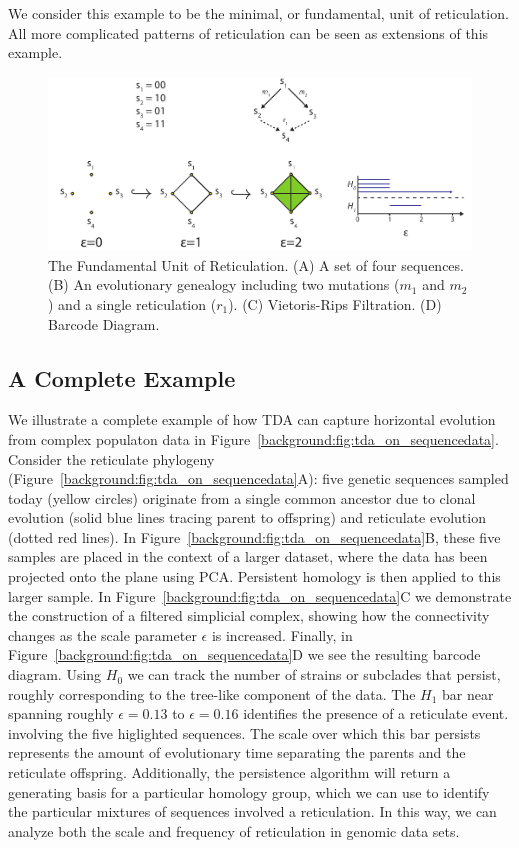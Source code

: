 We consider this example to be the minimal, or fundamental, unit of reticulation.
All more complicated patterns of reticulation can be seen as extensions of this example.

\begin{figure}
\centering
\includegraphics[width=\textwidth]{./fig/background/four_gamete_test.pdf}
\caption[Fundamental Unit of Reticulation]{The Fundamental Unit of Reticulation. (A) A set of four sequences. (B) An evolutionary genealogy including two mutations ($m_1$ and $m_2$) and a single reticulation ($r_1$). (C) Vietoris-Rips Filtration. (D) Barcode Diagram.}
\label{background:fig:four_gamete_test}
\end{figure}

\subsection{A Complete Example}

We illustrate a complete example of how TDA can capture horizontal evolution from complex populaton data in Figure~\ref{background:fig:tda_on_sequencedata}.
Consider the reticulate phylogeny (Figure~\ref{background:fig:tda_on_sequencedata}A): five genetic sequences sampled today (yellow circles) originate from a single common ancestor due to clonal evolution (solid blue lines tracing parent to offspring) and reticulate evolution (dotted red lines).
In Figure~\ref{background:fig:tda_on_sequencedata}B, these five samples are placed in the context of a larger dataset, where the data has been projected onto the plane using PCA.
Persistent homology is then applied to this larger sample.
In Figure~\ref{background:fig:tda_on_sequencedata}C we demonstrate the construction of a filtered simplicial complex, showing how the connectivity changes as the scale parameter $\epsilon$ is increased.
Finally, in Figure~\ref{background:fig:tda_on_sequencedata}D we see the resulting barcode diagram.
Using $H_0$ we can track the number of strains or subclades that persist, roughly corresponding to the tree-like component of the data.
The $H_1$ bar near spanning roughly $\epsilon=0.13$ to $\epsilon=0.16$ identifies the presence of a reticulate event. involving the five higlighted sequences.
The scale over which this bar persists represents the amount of evolutionary time separating the parents and the reticulate offspring.
Additionally, the persistence algorithm will return a generating basis for a particular homology group, which we can use to identify the particular mixtures of sequences involved a reticulation.
In this way, we can analyze both the scale and frequency of reticulation in genomic data sets.

